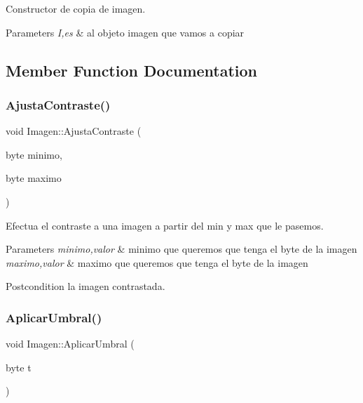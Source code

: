 Constructor de copia de imagen. 


\begin{DoxyParams}{Parameters}
{\em I,es} & al objeto imagen que vamos a copiar \\
\hline
\end{DoxyParams}


\subsection{Member Function Documentation}
\mbox{\label{class_imagen_ae38179e4f7fd4a2a7171135a45eef0da}} 
\subsubsection{\texorpdfstring{Ajusta\+Contraste()}{AjustaContraste()}}
{\footnotesize\ttfamily void Imagen\+::\+Ajusta\+Contraste (\begin{DoxyParamCaption}\item[{byte}]{minimo,  }\item[{byte}]{maximo }\end{DoxyParamCaption})}



Efectua el contraste a una imagen a partir del min y max que le pasemos. 


\begin{DoxyParams}{Parameters}
{\em minimo,valor} & minimo que queremos que tenga el byte de la imagen \\
\hline
{\em maximo,valor} & maximo que queremos que tenga el byte de la imagen \\
\hline
\end{DoxyParams}
\begin{DoxyPostcond}{Postcondition}
la imagen contrastada. 
\end{DoxyPostcond}
\mbox{\label{class_imagen_ab666abb816fa66e36e68834d9d3057fb}} 
\subsubsection{\texorpdfstring{Aplicar\+Umbral()}{AplicarUmbral()}}
{\footnotesize\ttfamily void Imagen\+::\+Aplicar\+Umbral (\begin{DoxyParamCaption}\item[{byte}]{t }\end{DoxyParamCaption})}




